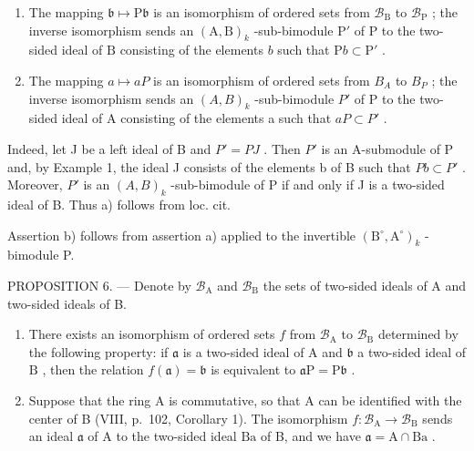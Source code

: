 \begin{enumerate}
\def\labelenumi{\alph{enumi})}
\item
  The mapping \(\mathfrak{b} \mapsto \mathrm{P}\mathfrak{b}\) is an isomorphism of ordered sets from \(\mathcal{B}_{\mathrm{B}}\) to \(\mathcal{B}_{\mathrm{P}}\) ; the inverse isomorphism sends an \((\mathrm{A},\mathrm{B})_k\) -sub-bimodule \(\mathrm{P}'\) of \(\mathrm{P}\) to the two-sided ideal of \(\mathrm{B}\) consisting of the elements \(b\) such that \(\mathrm{P}b \subset \mathrm{P}'\) .
\item
  The mapping \(a \mapsto aP\) is an isomorphism of ordered sets from \(B_{A}\) to \(B_{P}\) ; the inverse isomorphism sends an \((A, B)_{k}\) -sub-bimodule \(P'\) of P to the two-sided ideal of A consisting of the elements a such that \(aP \subset P'\) .
\end{enumerate}

Indeed, let J be a left ideal of B and \(P' = PJ\) . Then \(P'\) is an A-submodule of P and, by Example 1, the ideal J consists of the elements b of B such that \(Pb \subset P'\) . Moreover, \(P'\) is an \((A, B)_{k}\) -sub-bimodule of P if and only if J is a two-sided ideal of B. Thus a) follows from loc. cit.

Assertion b) follows from assertion a) applied to the invertible \((\mathrm{B}^{\circ}, \mathrm{A}^{\circ})_{k}\) -bimodule P.

PROPOSITION 6. --- Denote by \(\mathcal{B}_{\mathrm{A}}\) and \(\mathcal{B}_{\mathrm{B}}\) the sets of two-sided ideals of A and two-sided ideals of B.

\begin{enumerate}
\def\labelenumi{\alph{enumi})}
\item
  There exists an isomorphism of ordered sets \(f\) from \(\mathcal{B}_{\mathrm{A}}\) to \(\mathcal{B}_{\mathrm{B}}\) determined by the following property: if \(\mathfrak{a}\) is a two-sided ideal of \(\mathrm{A}\) and \(\mathfrak{b}\) a two-sided ideal of \(\mathrm{B}\) , then the relation \(f(\mathfrak{a}) = \mathfrak{b}\) is equivalent to \(\mathfrak{a}\mathrm{P} = \mathrm{P}\mathfrak{b}\) .
\item
  Suppose that the ring A is commutative, so that A can be identified with the center of B (VIII, p.~102, Corollary 1). The isomorphism \(f: \mathcal{B}_{\mathrm{A}} \to \mathcal{B}_{\mathrm{B}}\) sends an ideal \(\mathfrak{a}\) of A to the two-sided ideal \(\mathrm{Ba}\) of B, and we have \(\mathfrak{a} = \mathrm{A} \cap \mathrm{Ba}\) .
\end{enumerate}

